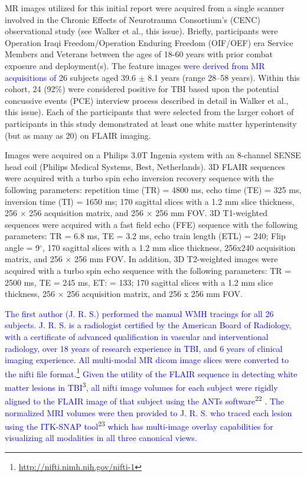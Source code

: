 \documentclass[11pt,]{article}
\let\rmarkdownfootnote\footnote%
\def\footnote{\protect\rmarkdownfootnote}
\begin{document}
MR images utilized for this initial report were acquired from a single
scanner involved in the Chronic Effects of Neurotrauma Consortium's
(CENC) observational study (see Walker et al., this issue). Briefly,
participants were Operation Iraqi Freedom/Operation Enduring Freedom
(OIF/OEF) era Service Members and Veterans between the ages of 18-60
years with prior combat exposure and deployment(s). The feature images
\textcolor{blue}{were derived from MR acquisitions of} 26 subjects aged
39.6 \(\pm\) 8.1 years (range 28--58 years). Within this cohort, 24
(92\%) were considered positive for TBI based upon the potential
concussive events (PCE) interview process described in detail in Walker
et al., this issue). Each of the participants that were selected from
the larger cohort of participants in this study demonstrated at least
one white matter hyperintensity (but as many as 20) on FLAIR imaging.

Images were acquired on a Philips 3.0T Ingenia system with an 8-channel
SENSE head coil (Philips Medical Systems, Best, Netherlands). 3D FLAIR
sequences were acquired with a turbo spin echo inversion recovery
sequence with the following parameters: repetition time (TR) = 4800 ms,
echo time (TE) = 325 ms, inversion time (TI) = 1650 ms; 170 sagittal
slices with a 1.2 mm slice thickness, 256 \(\times\) 256 acquisition
matrix, and 256 \(\times\) 256 mm FOV. 3D T1-weighted sequences were
acquired with a fast field echo (FFE) sequence with the following
parameters: TR = 6.8 ms, TE = 3.2 ms, echo train length (ETL) = 240;
Flip angle = 9\(^\circ\), 170 sagittal slices with a 1.2 mm slice
thickness, 256x240 acquisition matrix, and 256 \(\times\) 256 mm FOV. In
addition, 3D T2-weighted images were acquired with a turbo spin echo
sequence with the following parameters: TR = 2500 ms, TE = 245 ms, ET: =
133; 170 sagittal slices with a 1.2 mm slice thickness, 256 \(\times\)
256 acquisition matrix, and 256 x 256 mm FOV.

\textcolor{blue}{The first author (J. R. S.) performed the manual WMH tracings for all 26
subjects.  J. R. S. is a radiologist certified by the American Board of Radiology, with a certificate of advanced qualification in vascular and interventional radiology, over 18 years of research experience in TBI, and 6 years of clinical imaging experience.  All
multi-modal MR dicom image slices were converted to the nifti file format}.\footnote{\url{http://nifti.nimh.nih.gov/nifti-1}}
\textcolor{blue}{Given the
utility of the FLAIR sequence in detecting white matter lesions in TBI}\textsuperscript{3}\textcolor{blue}{, all nifti image volumes for each subject were rigidly aligned to the FLAIR image of that subject using the ANTs software}\textsuperscript{22}
\textcolor{blue}{.  The normalized MRI volumes were then provided to
J. R. S. who traced each lesion using the ITK-SNAP tool}\textsuperscript{23}
\textcolor{blue}{
which has multi-image overlay capabilities for visualizing all modalities in all three
canonical views.}
\end{document}
